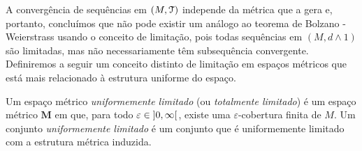 A convergência de sequências em $(M,\mathcal{T})$ independe da métrica que a gera e, portanto, concluímos que não pode existir um análogo ao teorema de Bolzano - Weierstrass usando o conceito de limitação, pois todas sequências em $(M,d \wedge 1)$ são limitadas, mas não necessariamente têm subsequência convergente. Definiremos a seguir um conceito distinto de limitação em espaços métricos que está mais relacionado à estrutura uniforme do espaço.

\begin{definition}
Um espaço métrico \emph{uniformemente limitado} (ou \emph{totalmente limitado}) é um espaço métrico $\bm M$ em que, para todo $\varepsilon \in \left]{0},{\infty}\right[$, existe uma $\varepsilon$-cobertura finita de $M$. Um conjunto \emph{uniformemente limitado} é um conjunto que é uniformemente limitado com a estrutura métrica induzida.
\end{definition}

